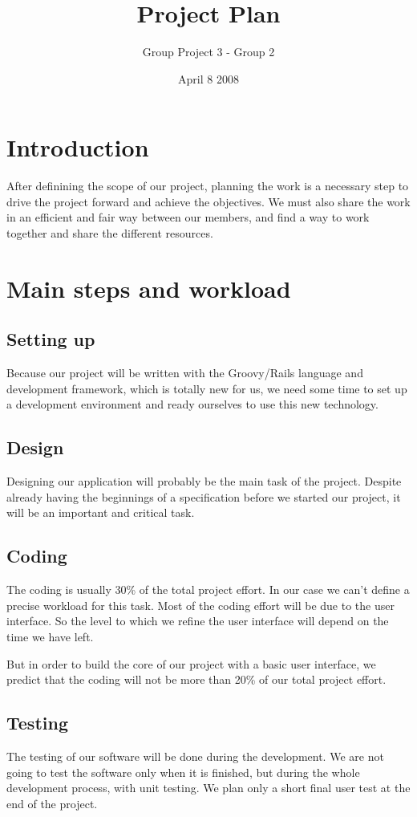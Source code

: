 \documentclass[a4paper,12pt]{article}
\title{Project Plan}
\author{Group Project 3 - Group 2}
\date{April 8 2008}
\begin{document}
\maketitle
\newpage
\tableofcontents
\newpage

\section{Introduction}
After definining the scope of our project, planning the work is a necessary step to drive the project forward and achieve the objectives.
We must also share the work in an efficient and fair way between our members, and find a way to work together and share the different resources.

\section{Main steps and workload}
\subsection{Setting up}
Because our project will be written with the Groovy/Rails language and development framework, which is totally new for us,
we need some time to set up a development environment and ready ourselves to use this new technology.
\subsection{Design}
Designing our application will probably be the main task of the project.
Despite already having the beginnings of a specification before we started our project, it will be an important and critical task.
\subsection{Coding}
The coding is usually 30\% of the total project effort. In our case we can't define a precise workload for this task. Most of the coding effort will be due to the user interface.
So the level to which we refine the user interface will depend on the time we have left.

But in order to build the core of our project with a basic user interface, we predict that the coding will not be more than 20\% of our total project effort.
\subsection{Testing}
The testing of our software will be done during the development. We are not going to test the software only when it is finished, but during the whole development process, with unit testing.
We plan only a short final user test at the end of the project.
\end{document}
